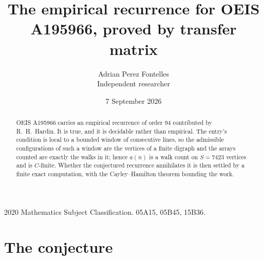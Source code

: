 \documentclass[11pt,a4paper]{article}
\title{The empirical recurrence for OEIS A195966, proved by transfer matrix}
\author{Adrian Perez Fontelles\\ \small Independent researcher}
\date{7 September 2026}
\theoremstyle{plain}
\theoremstyle{definition}
\begin{document}
\maketitle

\begin{abstract}
OEIS A195966 carries an empirical recurrence of order $94$ contributed by R.~H.~Hardin. It is
true, and it is decidable rather than empirical. The entry's condition is local to a bounded window of consecutive lines, so
the admissible configurations of such a window are the vertices of a finite digraph and the
arrays counted are exactly the walks in it; hence $a(n)$ is a walk count on $S=7423$ vertices
and is $C$-finite. Whether the conjectured recurrence annihilates it is then settled by a
finite exact computation, with the Cayley--Hamilton theorem bounding the work.
\end{abstract}

\noindent\small 2020 Mathematics Subject Classification. 05A15, 05B45, 15B36.\normalsize

\section{The conjecture}
\end{document}

